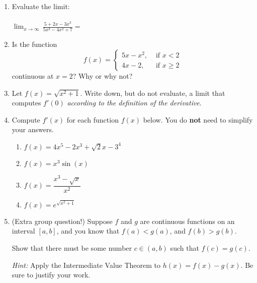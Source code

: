 \documentclass[12pt]{article}
\newcommand{\points}[1]{\marginpar{\hspace{24pt}[#1]}}
\newcommand{\di}{\displaystyle}
\begin{document}
 \begin{enumerate}
 \item  Evaluate the limit: \points{3}\\
 \\
$\di  \lim_{x\to \infty}\,\frac{5+2x-3x^3}{5x^3-4x^2+7}=$
 
 
 \vspace{2in}
 
 \item Is the function \points{3}
 \[
 f(x) = \begin{cases} 5x-x^2, & \text{ if } x<2\\ 4x-2, & \text{ if } x\geq 2\end{cases}
 \]
 continuous at $x=2$? Why or why not? 
 
 \vspace{3in}
 
 \item Let $f(x) = \sqrt{x^2+1}$. Write down, but do not evaluate, a limit that computes $f'(0)$ \textit{according to the definition of the derivative}. \points{2}
 
\newpage

\item Compute $f'(x)$ for each function $f(x)$ below. You do \textbf{not} need to simplify your answers.
\begin{enumerate}
\item $f(x) = 4x^5-2x^3+\sqrt{2}x-3^4$\points{2}

\vspace{1.5in}

\item $f(x) = x^3\sin(x)$ \points{2}

\vspace{1.75in}

\item $f(x) = \dfrac{x^3-\sqrt{x}}{x^2}$ \points{3}

\vspace{2in}

\item $\di f(x) = e^{\sqrt{x^2+1}}$ \points{3}
\end{enumerate}

\newpage

\item (Extra group question!) Suppose $f$ and $g$ are continuous functions on an interval $[a,b]$, and you know that $f(a)<g(a)$, and $f(b)>g(b)$. \points{2}

Show that there must be some number $c\in (a,b)$ such that $f(c)=g(c)$.

\medskip

\textit{Hint:} Apply the Intermediate Value Theorem to $h(x)=f(x)-g(x)$. Be sure to justify your work.
\end{enumerate}
\end{document}
